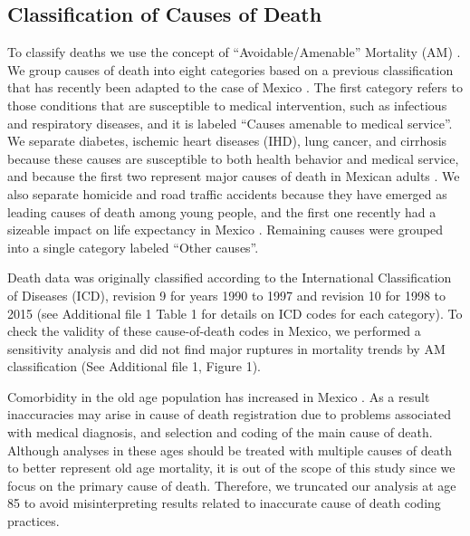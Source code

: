 \documentclass{bmcart}
\begin{document}
\subsection*{Classification of Causes of Death}
To classify deaths we use the concept of ``Avoidable/Amenable'' Mortality (AM) \cite{nolte&mckee2004, nolte&mckee2008}. We group causes of death into eight categories based on a previous classification  \cite{elo2014} that has recently been adapted to the case of Mexico \cite{Aburto2015}. The first category refers to those conditions that are susceptible to medical intervention, such as infectious and respiratory diseases, and it is labeled ``Causes amenable to medical service''. We separate diabetes, ischemic heart diseases (IHD), lung
cancer, and cirrhosis because these causes are susceptible to both health behavior
and medical service, and because the first two represent major causes of death
in Mexican adults \cite{gomez2016dissonant}. We also separate
homicide and road traffic accidents because they have emerged as
leading causes of death among young people, and the first one recently had a sizeable
impact on life expectancy in Mexico \cite{Aburto2015}. Remaining causes were grouped into a single category labeled ``Other causes''. 

Death data was originally classified according to the International Classification of Diseases (ICD), revision 9 for years 1990 to 1997 and revision 10 for 1998 to 2015 (see Additional file 1 Table 1 for details on ICD codes for each category). To check the validity of these cause-of-death codes in Mexico, we performed a sensitivity analysis and did not find major ruptures in mortality trends by AM classification (See Additional file 1, Figure 1).

Comorbidity in the old age population has increased in Mexico \cite{patel2006comorbidity}. As a result inaccuracies may arise in cause of death registration due to problems associated with medical diagnosis, and selection and coding of the main cause of death. Although analyses in these ages should be treated with multiple causes of death to better represent old age mortality, it is out of the scope of this study since we focus on the primary cause of death. Therefore, we truncated our analysis at age 85 to avoid misinterpreting results related to inaccurate cause of death coding practices.
\end{document}
